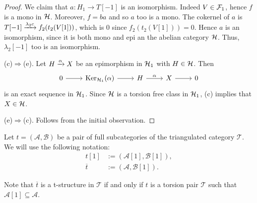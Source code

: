 \begin{proof}
  We claim that $a:H_1\to T[-1]$ is an isomorphism. Indeed $V\in\mathcal{F}_1$, hence $f$ is a mono in $\mathcal{H}$. Moreover, $f=ba$ and so $a$ too is a mono. The cokernel of $a$ is $T[-1]\xrightarrow{\lambda_2 c}f_2(t_2(V[1]))$, which is 0 since $f_2(t_2(V[1]))=0$. Hence $a$ is an isomorphism, since it is both mono and epi an the abelian category $\mathcal{H}$. Thus, $\lambda_2[-1]$ too is an isomorphism. 

  \smallskip\noindent
  (c)$\Rightarrow$(e). Let $H\xrightarrow{\alpha}X$ be an epimorphism in $\mathcal{H}_1$ with $H\in\mathcal{H}$. Then
  \begin{equation*}
    \begin{tikzcd}
      0\arrow{r}& \Ker_{\clH_1}(\alpha)\arrow{r}& H\arrow{r}{\alpha}& X\arrow{r} & 0
    \end{tikzcd}
  \end{equation*}
  is an exact sequence in $\mathcal{H}_1$. Since $\mathcal{H}$ is a torsion free class in $\mathcal{H}_1$, (c) implies that $X\in\mathcal{H}$.

  \smallskip\noindent
  (e)$\Rightarrow$(c). Follows from the initial observation.

\end{proof}

Let $t=(\mathcal{A},\mathcal{B})$ be a pair of full subcategories of the triangulated
category $\mathcal{T}$. We will use the following notation:
\begin{align*}
  t[1] &:= (\mathcal{A}[1],\mathcal{B}[1]),\\
  \overline{t} &:= (\mathcal{A},\mathcal{B}[1]).
\end{align*}

Note that $\overline{t}$ is a t-structure in $\mathcal{T}$ if and only if $t$ is a torsion
pair $\mathcal{T}$ such that $\mathcal{A}[1]\subseteq\mathcal{A}$.

